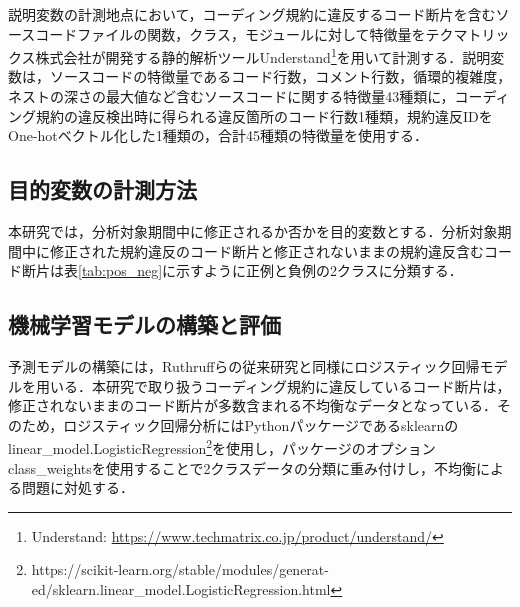 \documentclass[T,J]{fose} %
\begin{document}
説明変数の計測地点において，コーディング規約に違反するコード断片を含むソースコードファイルの関数，クラス，モジュールに対して特徴量をテクマトリックス株式会社が開発する静的解析ツールUnderstand\footnote{Understand: \url{https://www.techmatrix.co.jp/product/understand/}}を用いて計測する．説明変数は，ソースコードの特徴量であるコード行数，コメント行数，循環的複雑度，ネストの深さの最大値など含むソースコードに関する特徴量43種類に，コーディング規約の違反検出時に得られる違反箇所のコード行数1種類，規約違反IDをOne-hotベクトル化した1種類の，合計45種類の特徴量を使用する．

\subsection{目的変数の計測方法}

本研究では，分析対象期間中に修正されるか否かを目的変数とする．分析対象期間中に修正された規約違反のコード断片と修正されないままの規約違反含むコード断片は表\ref{tab:pos_neg}に示すように正例と負例の2クラスに分類する．

\begin{table}[t]
    \centering
    \caption{正例と負例の分類}
    \label{tab:pos_neg}
\end{table}

\subsection{機械学習モデルの構築と評価}

予測モデルの構築には，Ruthruffらの従来研究と同様にロジスティック回帰モデルを用いる\cite{JyuraiPre}．本研究で取り扱うコーディング規約に違反しているコード断片は，修正されないままのコード断片が多数含まれる不均衡なデータとなっている．そのため，ロジスティック回帰分析にはPythonパッケージであるsklearnのlinear\_model.LogisticRegression\footnote{https://scikit-learn.org/stable/modules/generat-\\ed/sklearn.linear\_model.LogisticRegression.html}を使用し，パッケージのオプションclass\_weightsを使用することで2クラスデータの分類に重み付けし，不均衡による問題に対処する．
\end{document}
